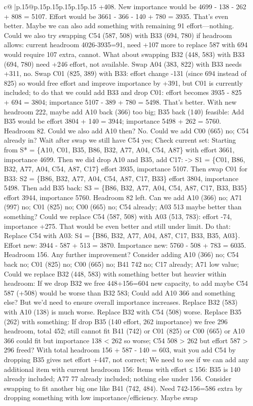 \documentclass{article}
\begin{document}
{\begin{supertabular}{c@{$\;$}|p{.15\linewidth}@{}p{.15\linewidth}p{.15\linewidth}p{.15\linewidth}p{.15\linewidth}p{.15\linewidth}}
{{{+408. New importance would be 4699 {-} 138 {-} 262 + 808 = 5107. Effort would be 3661 {-} 366 {-} 140 + 780 = 3935. That’s even better. Maybe we can also add something with remaining 91 effort—nothing. Could we also try swapping C54 (587, 508) with B33 (694, 780) if headroom allows: current headroom 4026{-}3935=91, need +107 more to replace 587 with 694 would require 107 extra, cannot. What about swapping B32 (448, 583) with B33 (694, 780) need +246 effort, not available. Swap A04 (383, 822) with B33 needs +311, no. Swap C01 (825, 389) with B33: effort change {-}131 (since 694 instead of 825) so would free effort and improve importance by +391, but C01 is currently included; to do that we could add B33 and drop C01: effort becomes 3935 {-} 825 + 694 = 3804; importance 5107 {-} 389 + 780 = 5498. That’s better. With new headroom 222, maybe add A10 back (366) too big; B35 back (140) feasible: Add B35 would be effort 3804 + 140 = 3944; importance 5498 + 262 = 5760. Headroom 82. Could we also add A10 then? No. Could we add C00 (665) no; C54 already in? Wait after swap we still have C54 yes; Check current set: Starting from S* = \{A10, C01, B35, B86, B32, A77, A04, C54, A87\} with effort 3661, importance 4699. Then we did drop A10 and B35, add C17: {-}> S1 = \{C01, B86, B32, A77, A04, C54, A87, C17\} effort 3935, importance 5107. Then swap C01 for B33: S2 = \{B86, B32, A77, A04, C54, A87, C17, B33\} effort 3804, importance 5498. Then add B35 back: S3 = \{B86, B32, A77, A04, C54, A87, C17, B33, B35\} effort 3944, importance 5760. Headroom 82 left. Can we add A10 (366) no; A71 (997) no; C01 (825) no; C00 (665) no; C54 already; A03 513 maybe better than something? Could we replace C54 (587, 508) with A03 (513, 783): effort {-}74, importance +275. That would be even better and still under limit. Do that: Replace C54 with A03: S4 = \{B86, B32, A77, A04, A87, C17, B33, B35, A03\}. Effort new: 3944 {-} 587 + 513 = 3870. Importance new: 5760 {-} 508 + 783 = 6035. Headroom 156. Any further improvement? Consider adding A10 (366) no; C54 back no; C01 (825) no; C00 (665) no; B41 742 no; C17 already; A71 low value; Could we replace B32 (448, 583) with something better but heavier within headroom: If we drop B32 we free 448+156=604 new capacity, to add maybe C54 587 (+508) would be worse than B32 583; Could add A10 366 and something else? But we'd need to ensure overall importance increases. Replace B32 (583) with A10 (138) is much worse. Replace B32 with C54 (508) worse. Replace B35 (262) with something: If drop B35 (140 effort, 262 importance) we free 296 headroom, total 452; still cannot fit B41 (742) or C01 (825) or C00 (665) or A10 366 could fit but importance 138 < 262 so worse; C54 508 > 262 but effort 587 > 296 freed? With total headroom 156 + 587 {-} 140 = 603, wait you add C54 by dropping B35 gives net effort +447, not correct; We need to see if we can add any additional item with current headroom 156: Items with effort ≤ 156: B35 is 140 already included; A77 77 already included; nothing else under 156. Consider swapping to fit another big one like B41 (742, 484). Need 742{-}156=586 extra by dropping something with low importance/efficiency. Maybe swap }}}
\end{supertabular}}
\end{document}
